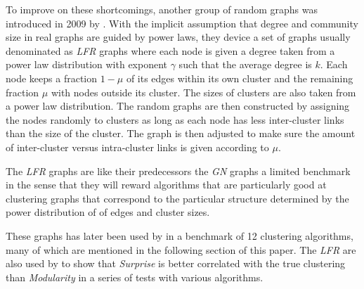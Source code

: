 To improve on these shortcomings, another group of random graphs was 
introduced in 2009 by \cite{lancichinetti2008}. With the implicit 
assumption that degree and community size in real graphs are guided by 
power laws, they device a set of graphs usually denominated as 
\emph{LFR} graphs where each node is given a degree taken from a power 
law distribution with exponent $\gamma$ such that the average degree is 
$k$.  Each node keeps a fraction $1-\mu$ of its edges within its own 
cluster and the remaining fraction $\mu$ with nodes outside its cluster.  
The sizes of clusters are also taken from a power law distribution. The 
random graphs are then constructed by assigning the nodes randomly to 
clusters as long as each node has less inter-cluster links than the size 
of the cluster. The graph is then adjusted to make sure the amount of 
inter-cluster versus intra-cluster links is given according to $\mu$.

The \emph{LFR} graphs are like their predecessors the \emph{GN} graphs a 
limited benchmark in the sense that they will reward algorithms that are 
particularly good at clustering graphs that correspond to the particular 
structure determined by the power distribution of of edges and cluster 
sizes.

These graphs has later been used by \cite{lancichinetti2009} in a 
benchmark of 12 clustering algorithms, many of which are mentioned in 
the following section of this paper. The \emph{LFR} are also used by 
\cite{aldecoa2010} to show that \emph{Surprise} is better correlated 
with the true clustering than \emph{Modularity} in a series of tests 
with various algorithms.

